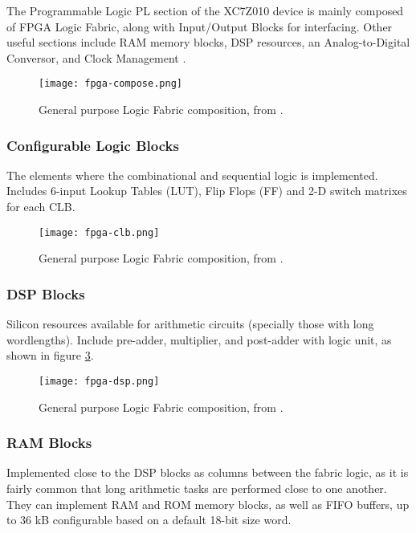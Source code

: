 The Programmable Logic PL section of the XC7Z010 device is mainly composed of FPGA Logic Fabric,
along with Input/Output Blocks for interfacing. Other useful sections include RAM memory blocks, DSP
resources, an Analog-to-Digital Conversor, and Clock Management \cite[p.~23]{Crokett2014}.

\begin{figure}[htp]
	\centering
	\texttt{[image: fpga-compose.png]}
	\caption{General purpose Logic Fabric composition, from \cite{Crokett2014}.}
	\label{fig:fpga-compose}
\end{figure}

\subsubsection{Configurable Logic Blocks}

The elements where the combinational and sequential logic is implemented. Includes 6-input Lookup
Tables (LUT), Flip Flops (FF) and 2-D switch matrixes for each CLB.

\begin{figure}[htp]
	\centering
	\texttt{[image: fpga-clb.png]}
	\caption{General purpose Logic Fabric composition, from \cite{Crokett2014}.}
	\label{fig:fpga-clb}
\end{figure}

\subsubsection{DSP Blocks}

Silicon resources available for arithmetic circuits (specially those with long wordlengths). Include
pre-adder, multiplier, and post-adder with logic unit, as shown in figure \ref{fig:fpga-dsp}.

\begin{figure}[htp]
	\centering
	\texttt{[image: fpga-dsp.png]}
	\caption{General purpose Logic Fabric composition, from \cite{Crokett2014}.}
	\label{fig:fpga-dsp}
\end{figure}

\subsubsection{RAM Blocks}

Implemented close to the DSP blocks as columns between the fabric logic, as it is fairly common that
long arithmetic tasks are performed close to one another. They can implement RAM and ROM memory
blocks, as well as FIFO buffers, up to 36 kB configurable based on a default 18-bit size word.

